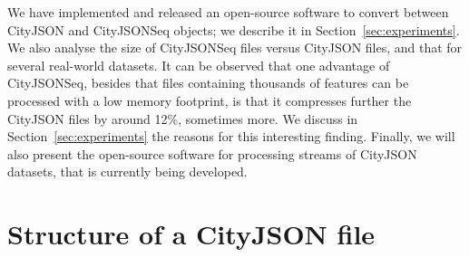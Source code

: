 \documentclass{isprs} %
\begin{document}
We have implemented and released an open-source software to convert between CityJSON and CityJSONSeq objects; we describe it in Section~\ref{sec:experiments}.
We also analyse the size of CityJSONSeq files versus CityJSON files, and that for several real-world datasets.
It can be observed that one advantage of CityJSONSeq, besides that files containing thousands of features can be processed with a low memory footprint, is that it compresses further the CityJSON files by around 12\%, sometimes more.
We discuss in Section~\ref{sec:experiments} the reasons for this interesting finding.
Finally, we will also present the open-source software for processing streams of CityJSON datasets, that is currently being developed.

%
\section{Structure of a CityJSON file}%
\label{sec:cityjson}

\end{document}
